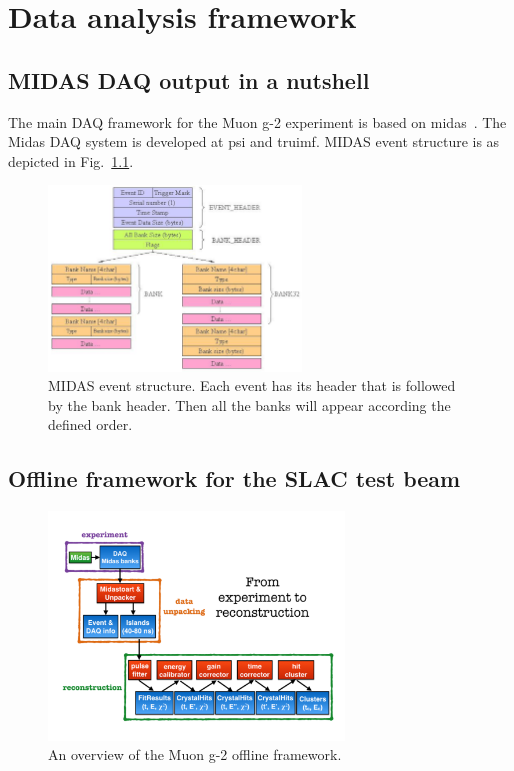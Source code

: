 \chapter{Data analysis framework}
\label{chap:analysisframework}

\section{MIDAS DAQ output in a nutshell}
The main DAQ framework for the Muon g-2 experiment is based on \ac{midas}~\cite{Midas}. The Midas DAQ system is developed at \ac{psi} and \ac{truimf}.
MIDAS event structure is as depicted in Fig.~\ref{fig:MIDASEventStructure}.

\begin{figure}[htbp]
\centering
\includegraphics[width=0.6\textwidth]{pics/MIDASEventStructure.pdf} 
\caption{MIDAS event structure. Each event has its header that is followed by the bank header. Then all the banks will appear according the defined order.}\label{fig:MIDASEventStructure}
\end{figure}

\section{Offline framework for the SLAC test beam}

\begin{figure}[htbp]
\centering
\includegraphics[width=0.7\textwidth]{pics/offline_exp_framework}
\caption{An overview of the Muon g-2 offline framework.}
\label{pic:exp_framework}
\end{figure}

